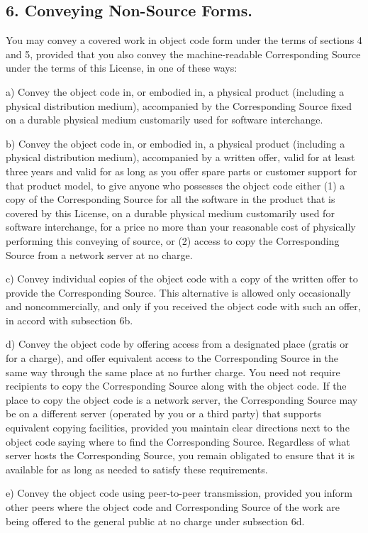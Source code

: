 \subsection{6. Conveying Non-Source Forms.}
You may convey a covered work in object code form under the terms of sections 4 and 5, provided that you also convey the machine-readable Corresponding Source under the terms of this License, in one of these ways:\par
a) Convey the object code in, or embodied in, a physical product (including a physical distribution medium), accompanied by the Corresponding Source fixed on a durable physical medium customarily used for software interchange.\par
b) Convey the object code in, or embodied in, a physical product (including a physical distribution medium), accompanied by a written offer, valid for at least three years and valid for as long as you offer spare parts or customer support for that product model, to give anyone who possesses the object code either (1) a copy of the Corresponding Source for all the software in the product that is covered by this License, on a durable physical medium customarily used for software interchange, for a price no more than your reasonable cost of physically performing this conveying of source, or (2) access to copy the Corresponding Source from a network server at no charge.\par
c) Convey individual copies of the object code with a copy of the written offer to provide the Corresponding Source. This alternative is allowed only occasionally and noncommercially, and only if you received the object code with such an offer, in accord with subsection 6b.\par
d) Convey the object code by offering access from a designated place (gratis or for a charge), and offer equivalent access to the Corresponding Source in the same way through the same place at no further charge. You need not require recipients to copy the Corresponding Source along with the object code. If the place to copy the object code is a network server, the Corresponding Source may be on a different server (operated by you or a third party) that supports equivalent copying facilities, provided you maintain clear directions next to the object code saying where to find the Corresponding Source. Regardless of what server hosts the Corresponding Source, you remain obligated to ensure that it is available for as long as needed to satisfy these requirements.\par
e) Convey the object code using peer-to-peer transmission, provided you inform other peers where the object code and Corresponding Source of the work are being offered to the general public at no charge under subsection 6d.\par
